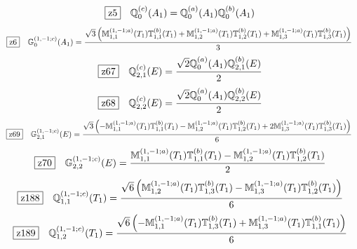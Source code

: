 \documentclass[fleqn,10pt,landscape]{jsarticle}
\begin{document}
\begin{dmath*}
\hspace*{3mm}\fbox{z5}\quad \mathbb{Q}_{0}^{(c)}(A_{1})=\mathbb{Q}_{0}^{(a)}(A_{1}) \mathbb{Q}_{0}^{(b)}(A_{1})
\end{dmath*}
\begin{dmath*}
\hspace*{3mm}\fbox{z6}\quad \mathbb{G}_{0}^{(1,-1;c)}(A_{1})=\frac{\sqrt{3} \left(\mathbb{M}_{1,1}^{(1,-1;a)}(T_{1}) \mathbb{T}_{1,1}^{(b)}(T_{1}) + \mathbb{M}_{1,2}^{(1,-1;a)}(T_{1}) \mathbb{T}_{1,2}^{(b)}(T_{1}) + \mathbb{M}_{1,3}^{(1,-1;a)}(T_{1}) \mathbb{T}_{1,3}^{(b)}(T_{1})\right)}{3}
\end{dmath*}
\begin{dmath*}
\hspace*{3mm}\fbox{z67}\quad \mathbb{Q}_{2,1}^{(c)}(E)=\frac{\sqrt{2} \mathbb{Q}_{0}^{(a)}(A_{1}) \mathbb{Q}_{2,1}^{(b)}(E)}{2}
\end{dmath*}
\begin{dmath*}
\hspace*{3mm}\fbox{z68}\quad \mathbb{Q}_{2,2}^{(c)}(E)=\frac{\sqrt{2} \mathbb{Q}_{0}^{(a)}(A_{1}) \mathbb{Q}_{2,2}^{(b)}(E)}{2}
\end{dmath*}
\begin{dmath*}
\hspace*{3mm}\fbox{z69}\quad \mathbb{G}_{2,1}^{(1,-1;c)}(E)=\frac{\sqrt{3} \left(- \mathbb{M}_{1,1}^{(1,-1;a)}(T_{1}) \mathbb{T}_{1,1}^{(b)}(T_{1}) - \mathbb{M}_{1,2}^{(1,-1;a)}(T_{1}) \mathbb{T}_{1,2}^{(b)}(T_{1}) + 2 \mathbb{M}_{1,3}^{(1,-1;a)}(T_{1}) \mathbb{T}_{1,3}^{(b)}(T_{1})\right)}{6}
\end{dmath*}
\begin{dmath*}
\hspace*{3mm}\fbox{z70}\quad \mathbb{G}_{2,2}^{(1,-1;c)}(E)=\frac{\mathbb{M}_{1,1}^{(1,-1;a)}(T_{1}) \mathbb{T}_{1,1}^{(b)}(T_{1}) - \mathbb{M}_{1,2}^{(1,-1;a)}(T_{1}) \mathbb{T}_{1,2}^{(b)}(T_{1})}{2}
\end{dmath*}
\begin{dmath*}
\hspace*{3mm}\fbox{z188}\quad \mathbb{Q}_{1,1}^{(1,-1;c)}(T_{1})=\frac{\sqrt{6} \left(\mathbb{M}_{1,2}^{(1,-1;a)}(T_{1}) \mathbb{T}_{1,3}^{(b)}(T_{1}) - \mathbb{M}_{1,3}^{(1,-1;a)}(T_{1}) \mathbb{T}_{1,2}^{(b)}(T_{1})\right)}{6}
\end{dmath*}
\begin{dmath*}
\hspace*{3mm}\fbox{z189}\quad \mathbb{Q}_{1,2}^{(1,-1;c)}(T_{1})=\frac{\sqrt{6} \left(- \mathbb{M}_{1,1}^{(1,-1;a)}(T_{1}) \mathbb{T}_{1,3}^{(b)}(T_{1}) + \mathbb{M}_{1,3}^{(1,-1;a)}(T_{1}) \mathbb{T}_{1,1}^{(b)}(T_{1})\right)}{6}
\end{dmath*}
\end{document}
